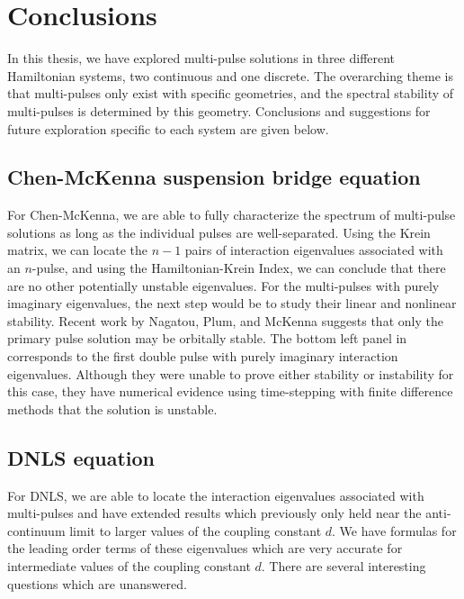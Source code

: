 \documentclass[thesis2.tex]{subfiles}
\begin{document}
\iffulldocument\else
	\chapter{Conclusions}
\fi

In this thesis, we have explored multi-pulse solutions in three different Hamiltonian systems, two continuous and one discrete. The overarching theme is that multi-pulses only exist with specific geometries, and the spectral stability of multi-pulses is determined by this geometry. Conclusions and suggestions for future exploration specific to each system are given below.

\section{Chen-McKenna suspension bridge equation}

For Chen-McKenna, we are able to fully characterize the spectrum of multi-pulse solutions as long as the individual pulses are well-separated. Using the Krein matrix, we can locate the $n-1$ pairs of interaction eigenvalues associated with an $n$-pulse, and using the Hamiltonian-Krein Index, we can conclude that there are no other potentially unstable eigenvalues. For the multi-pulses with purely imaginary eigenvalues, the next step would be to study their linear and nonlinear stability. Recent work by Nagatou, Plum, and McKenna \cite{Nagatou2019} suggests that only the primary pulse solution may be orbitally stable. The bottom left panel in \cite[Figure 2]{Nagatou2019} corresponds to the first double pulse with purely imaginary interaction eigenvalues. Although they were unable to prove either stability or instability for this case, they have numerical evidence using time-stepping with finite difference methods that the solution is unstable. 

\section{DNLS equation}

For DNLS, we are able to locate the interaction eigenvalues associated with multi-pulses and have extended results which previously only held near the anti-continuum limit to larger values of the coupling constant $d$. We have formulas for the leading order terms of these eigenvalues which are very accurate for intermediate values of the coupling constant $d$. There are several interesting questions which are unanswered. 
\end{document}

